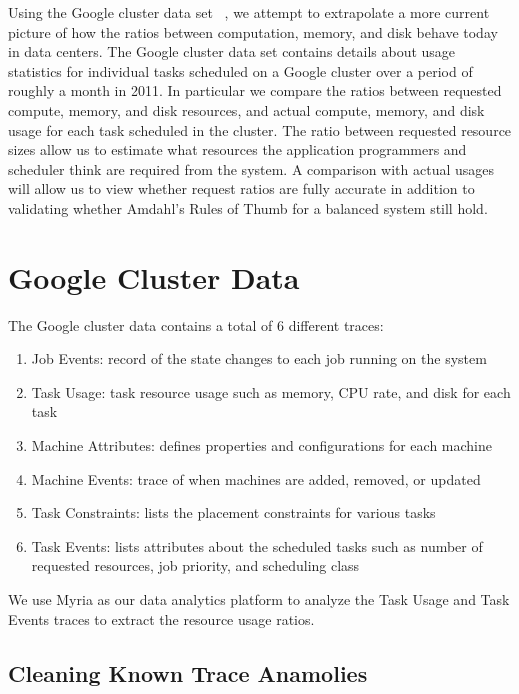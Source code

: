 \documentclass{sig-alternate}
\begin{document}
Using the Google cluster data set ~\cite{clusterdata:Wilkes2011, clusterdata:Reiss2011}, we attempt to extrapolate a more current picture of how the ratios between computation, memory, and disk behave today in data centers.
The Google cluster data set contains details about usage statistics for individual tasks scheduled on a Google cluster over a period of roughly a month in 2011.
In particular we compare the ratios between requested compute, memory, and disk resources, and actual compute, memory, and disk usage for each task scheduled in the cluster.
The ratio between requested resource sizes allow us to estimate what resources the application programmers and scheduler think are required from the system.
A comparison with actual usages will allow us to view whether request ratios are fully accurate in addition to validating whether Amdahl's Rules of Thumb for a balanced system still hold.

\section{Google Cluster Data}

The Google cluster data contains a total of 6 different traces:
\begin{enumerate}
\item Job Events: record of the state changes to each job running on the system
\item Task Usage: task resource usage such as memory, CPU rate, and disk for each task
\item Machine Attributes: defines properties and configurations for each machine
\item Machine Events: trace of when machines are added, removed, or updated
\item Task Constraints: lists the placement constraints for various tasks
\item Task Events: lists attributes about the scheduled tasks such as number of requested resources, job priority, and scheduling class
\end{enumerate}
We use Myria \cite{HalperinACCKMORWWXBHS14SIGMOD} as our data analytics platform to analyze the Task Usage and Task Events traces to extract the resource usage ratios.

\subsection{Cleaning Known Trace Anamolies}
\end{document}
